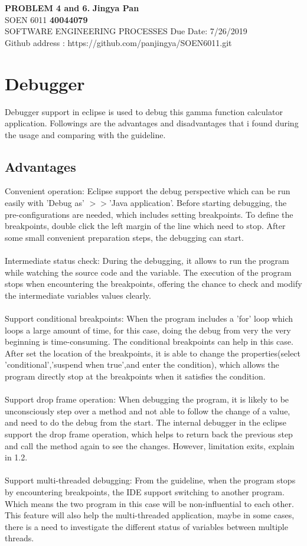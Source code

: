 \documentclass[a4paper, 11pt]{article}
\begin{document}
\noindent
\large\textbf{PROBLEM 4 and 6.} \hfill \textbf{Jingya Pan} \\
\normalsize SOEN 6011 \hfill \textbf{40044079} \\
 SOFTWARE ENGINEERING PROCESSES \hfill Due Date: 7/26/2019 \\
\hfill Github address : https://github.com/panjingya/SOEN6011.git

\section{Debugger}
Debugger support in eclipse is used to debug this gamma function calculator application. Followings are the advantages and disadvantages that i found during the usage and comparing with the guideline.
\subsection{Advantages}
Convenient operation: Eclipse support the debug perspective which can be run easily with 'Debug as' $>>$'Java application'. Before starting debugging, the pre-configurations are needed, which includes setting breakpoints. To define the breakpoints, double click the left margin of the line which need to stop. After some small convenient preparation steps, the debugging can start.\\\\
\noindent
Intermediate status check: During the debugging, it allows to run the program while watching the source code and the variable. The execution of the program stops when encountering the breakpoints, offering the chance to check and modify the intermediate variables values clearly.\\\\
\noindent
Support conditional breakpoints: When the program includes a 'for' loop which loops a large amount of time, for this case, doing the debug from very the very beginning is time-consuming. The conditional breakpoints can help in this case.  After set the location of the breakpoints, it is able to change the properties(select 'conditional','suspend when true',and enter the condition), which allows the program directly stop at the breakpoints when it satisfies the condition.\\\\
\noindent
Support drop frame operation: When debugging the program, it is likely to be unconsciously step over a method and not able to follow the change of a value, and need to do the debug from the start. The internal debugger in the eclipse support the drop frame operation, which helps to return back the previous step and call the method again to see the changes. However, limitation exits, explain in 1.2.\\\\
\noindent
Support multi-threaded debugging: From the guideline, when the program stops by encountering breakpoints, the IDE support switching to another program. Which means the two program in this case will be non-influential to each other. This feature will also help the multi-threaded application, maybe in some cases, there is a need to investigate the different status of variables between multiple threads.
\end{document}
